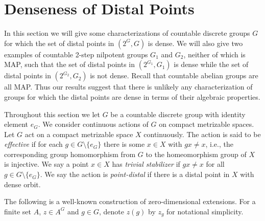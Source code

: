 \documentclass[11pt]{amsart}
\theoremstyle{definition}
\numberwithin{equation}{section}
\theoremstyle{definition}
\begin{document}
\section{Denseness of Distal Points\label{sec:4}}

In this section we will give some characterizations of countable discrete groups $G$ for which the set of distal points in $(2^G, G)$ is dense. We will also give two examples of countable 2-step nilpotent groups $G_1$ and $G_2$, neither of which is MAP, such that the set of distal points in $(2^{G_1},G_1)$ is dense while the set of distal points in $(2^{G_2},G_2)$ is not dense. Recall that countable abelian groups are all MAP.  Thus our results suggest that there is unlikely any characterization of groups for which the distal points are dense in terms of their algebraic properties. 

Throughout this section we let $G$ be a countable discrete group with identity element $e_G$. We consider continuous actions of $G$ on compact metrizable spaces. Let $G$ act on a compact metrizable space $X$ continuously. The action is said to be {\em effective} if for each $g\in G\setminus \{e_G\}$ there  is some $x\in X$ with $gx\neq x$, i.e., the corresponding group homomorphism from $G$ to the homeomorphism group of $X$ is injective. 
We say a point $x\in X$ has {\em trivial stabilizer} if $gx\neq x$ for all $g\in G\setminus \{e_G\}$.
We say the action is {\em point-distal} if there is a distal point in $X$ with dense orbit. 

The following is a well-known construction of zero-dimensional extensions. For a finite set $A$, $z\in A^G$ and $g\in G$, denote $z(g)$ by $z_g$ for notational simplicity. 
\end{document}
